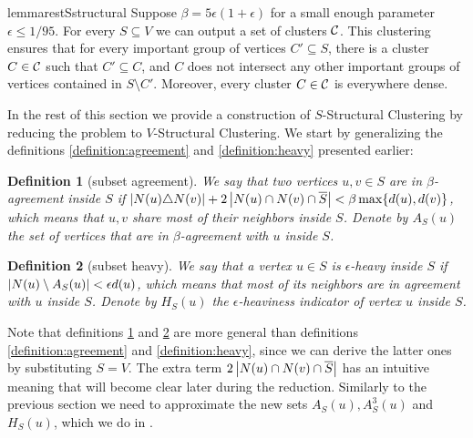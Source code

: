 \documentclass{article}
\newtheorem{definition}{Definition}[section]
\begin{document}
\begin{restatable}{lemma}{restSstructural}
\label{lemma:sclustering}
    Suppose $\beta = 5\epsilon(1+\epsilon)$ for a small enough parameter $\epsilon \leq 1/95$.
    For every $S \subseteq V$
    we can output a set of clusters $\mathcal{C}$. This clustering ensures that for every important group of vertices $C' \subseteq S$, there is a cluster $C \in \mathcal{C}$ such that $C' \subseteq C$, and $C$ does not intersect any other important groups of vertices contained in $S \setminus C'$. Moreover, every
    cluster $C \in \mathcal{C}$ is everywhere dense.
\end{restatable}

In the rest of this section we provide a construction of $S$-Structural Clustering by reducing the problem to $V$-Structural Clustering. We start by generalizing the definitions \ref{definition:agreement} and \ref{definition:heavy} presented earlier:

\begin{definition}[subset agreement]
\label{definition:subset_agreement}
We say that two vertices $u, v\in S$ are in $\beta$-agreement inside $S$ if $\left|N(u)\triangle N(v)\right| + 2\left|N(u)\cap N(v)\cap \overline{S}\right| < \beta \max\{d(u), d(v)\}$, which means that $u, v$ share most of their neighbors inside $S$. Denote by $A_S(u)$ the set of vertices that are in $\beta$-agreement with $u$ inside $S$.
\end{definition}

\begin{definition}[subset heavy]
\label{definition:subset_heavy}
We say that a vertex $u\in S$ is $\epsilon$-heavy inside $S$ if $\left|N(u) \setminus A_S(u)\right| < \epsilon d(u)$, which means that most of its neighbors are in agreement with $u$ inside $S$. Denote by $H_S(u)$ the $\epsilon$-heaviness indicator of vertex $u$ inside $S$.
\end{definition}

Note that definitions \ref{definition:subset_agreement} and \ref{definition:subset_heavy} are more general than definitions \ref{definition:agreement} and \ref{definition:heavy}, since we can derive the latter ones by substituting $S = V$. The extra term $2\left|N(u)\cap N(v)\cap \overline{S}\right|$ has an intuitive meaning that will become clear later during the reduction. Similarly to the previous section we need to approximate the new sets $A_S(u), A_S^3(u)$ and $H_S(u)$, which we do in .
\end{document}
